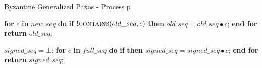 \begin{algorithm}
	\caption{Byzantine Generalized Paxos - Process p}
	\vspace*{-.6cm}
	\begin{multicols}{2}
		\begin{algorithmic}[1]		
			\State \textbf{for} $c$ \textbf{in} $new\_seq$ \textbf{do} 
			\State \hspace{\algorithmicindent} \textbf{if} $!\Call{contains}{old\_seq,c}$ \textbf{then}
			\State \hspace{\algorithmicindent}\hspace{\algorithmicindent}\hspace{\algorithmicindent} $old\_seq =  old\_seq \bullet c$;
			\State \textbf{end for}
			\State \textbf{return} $old\_seq$;
			\EndFunction
			
			\State
			\State $signed\_seq = \bot$;
			\State \textbf{for} $c$ \textbf{in} $full\_seq$ \textbf{do}
			\State \hspace{\algorithmicindent} \textbf{if}  \textbf{then}
			\State \hspace{\algorithmicindent}\hspace{\algorithmicindent} $signed\_seq = signed\_seq \bullet c$;
			\State \textbf{end for}
			\State \textbf{return} $signed\_seq$;
			\EndFunction
		\end{algorithmic}
	\end{multicols}
	\vspace*{-.4cm}
\end{algorithm}

